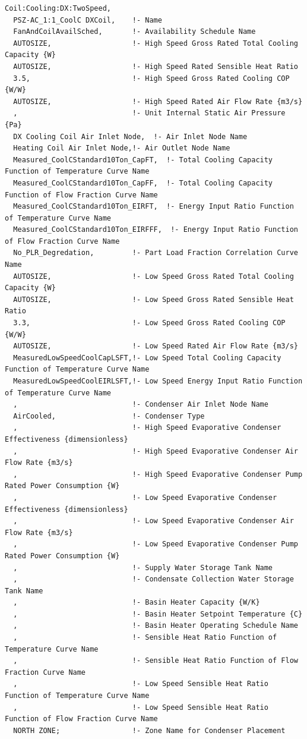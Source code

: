 \begin{lstlisting}
Coil:Cooling:DX:TwoSpeed,
  PSZ-AC_1:1_CoolC DXCoil,    !- Name
  FanAndCoilAvailSched,       !- Availability Schedule Name
  AUTOSIZE,                   !- High Speed Gross Rated Total Cooling Capacity {W}
  AUTOSIZE,                   !- High Speed Rated Sensible Heat Ratio
  3.5,                        !- High Speed Gross Rated Cooling COP {W/W}
  AUTOSIZE,                   !- High Speed Rated Air Flow Rate {m3/s}
  ,                           !- Unit Internal Static Air Pressure {Pa}
  DX Cooling Coil Air Inlet Node,  !- Air Inlet Node Name
  Heating Coil Air Inlet Node,!- Air Outlet Node Name
  Measured_CoolCStandard10Ton_CapFT,  !- Total Cooling Capacity Function of Temperature Curve Name
  Measured_CoolCStandard10Ton_CapFF,  !- Total Cooling Capacity Function of Flow Fraction Curve Name
  Measured_CoolCStandard10Ton_EIRFT,  !- Energy Input Ratio Function of Temperature Curve Name
  Measured_CoolCStandard10Ton_EIRFFF,  !- Energy Input Ratio Function of Flow Fraction Curve Name
  No_PLR_Degredation,         !- Part Load Fraction Correlation Curve Name
  AUTOSIZE,                   !- Low Speed Gross Rated Total Cooling Capacity {W}
  AUTOSIZE,                   !- Low Speed Gross Rated Sensible Heat Ratio
  3.3,                        !- Low Speed Gross Rated Cooling COP {W/W}
  AUTOSIZE,                   !- Low Speed Rated Air Flow Rate {m3/s}
  MeasuredLowSpeedCoolCapLSFT,!- Low Speed Total Cooling Capacity Function of Temperature Curve Name
  MeasuredLowSpeedCoolEIRLSFT,!- Low Speed Energy Input Ratio Function of Temperature Curve Name
  ,                           !- Condenser Air Inlet Node Name
  AirCooled,                  !- Condenser Type
  ,                           !- High Speed Evaporative Condenser Effectiveness {dimensionless}
  ,                           !- High Speed Evaporative Condenser Air Flow Rate {m3/s}
  ,                           !- High Speed Evaporative Condenser Pump Rated Power Consumption {W}
  ,                           !- Low Speed Evaporative Condenser Effectiveness {dimensionless}
  ,                           !- Low Speed Evaporative Condenser Air Flow Rate {m3/s}
  ,                           !- Low Speed Evaporative Condenser Pump Rated Power Consumption {W}
  ,                           !- Supply Water Storage Tank Name
  ,                           !- Condensate Collection Water Storage Tank Name
  ,                           !- Basin Heater Capacity {W/K}
  ,                           !- Basin Heater Setpoint Temperature {C}
  ,                           !- Basin Heater Operating Schedule Name
  ,                           !- Sensible Heat Ratio Function of Temperature Curve Name
  ,                           !- Sensible Heat Ratio Function of Flow Fraction Curve Name
  ,                           !- Low Speed Sensible Heat Ratio Function of Temperature Curve Name
  ,                           !- Low Speed Sensible Heat Ratio Function of Flow Fraction Curve Name
  NORTH ZONE;                 !- Zone Name for Condenser Placement
\end{lstlisting}

